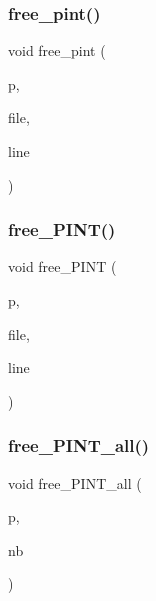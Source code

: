 \mbox{\label{_g_a_l_o_i_s_2memory_8_c_a7ac2756bc5fabb574a127563b6e827ce}} 
\subsubsection{\texorpdfstring{free\+\_\+pint()}{free\_pint()}}
{\footnotesize\ttfamily void free\+\_\+pint (\begin{DoxyParamCaption}\item[{\mbox{\hyperlink{ovoid_8h_a8df55fc7a73722f0cb22df9c9bcc5c9b}{pint}} $\ast$}]{p,  }\item[{const char $\ast$}]{file,  }\item[{int}]{line }\end{DoxyParamCaption})}

\mbox{\label{_g_a_l_o_i_s_2memory_8_c_acb14d0bd9c9a97e3a55503eec0ec50b8}} 
\subsubsection{\texorpdfstring{free\+\_\+\+P\+I\+N\+T()}{free\_PINT()}}
{\footnotesize\ttfamily void free\+\_\+\+P\+I\+NT (\begin{DoxyParamCaption}\item[{\mbox{\hyperlink{galois_8h_a09fddde158a3a20bd2dcadb609de11dc}{I\+NT}} $\ast$$\ast$}]{p,  }\item[{const char $\ast$}]{file,  }\item[{int}]{line }\end{DoxyParamCaption})}

\mbox{\label{_g_a_l_o_i_s_2memory_8_c_a8c74577588c4d669d8858633dd2f0b98}} 
\subsubsection{\texorpdfstring{free\+\_\+\+P\+I\+N\+T\+\_\+all()}{free\_PINT\_all()}}
{\footnotesize\ttfamily void free\+\_\+\+P\+I\+N\+T\+\_\+all (\begin{DoxyParamCaption}\item[{\mbox{\hyperlink{galois_8h_a09fddde158a3a20bd2dcadb609de11dc}{I\+NT}} $\ast$$\ast$}]{p,  }\item[{\mbox{\hyperlink{galois_8h_a09fddde158a3a20bd2dcadb609de11dc}{I\+NT}}}]{nb }\end{DoxyParamCaption})}

